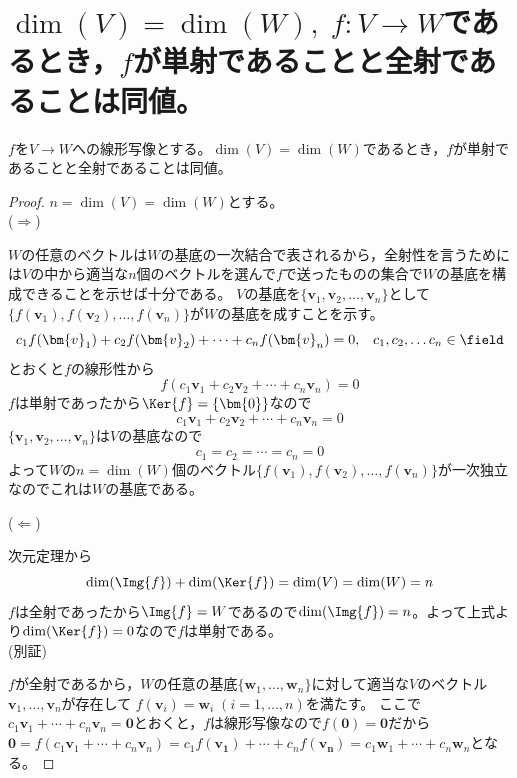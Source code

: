     \section{\texorpdfstring{$\dim(V)=\dim(W),\;f:V\to W$}{dim(V)=dim(W), f:V→W}であるとき，\texorpdfstring{$f$}{f}が単射であることと全射であることは同値。}
        \begin{shadebox}
            $f$を$V\rightarrow W$への線形写像とする。$\dim(V)=\dim(W)$であるとき，$f$が単射であることと全射であることは同値。
        \end{shadebox}
        \begin{proof}
            \quad\par
            \noindent
            $n=\dim(V)=\dim(W)$とする。\\
            ($\Rightarrow$)
            \par
            $W$の任意のベクトルは$W$の基底の一次結合で表されるから，全射性を言うためには$V$の中から適当な$n$個のベクトルを選んで$f$で送ったものの集合で$W$の基底を構成できることを示せば十分である。
            $V$の基底を$\{\bm{v}_1,\bm{v}_2,\dots,\bm{v}_n\}$として$\{f(\bm{v}_1),f(\bm{v}_2),\dots,f(\bm{v}_n)\}$が$W$の基底を成すことを示す。
            \[c_1f(\bm{v}_1)+c_2f(\bm{v}_2)+\dotsb+c_nf(\bm{v}_n) = 0,\;\;\;c_1,c_2,\dots c_n\in\field\]
            とおくと$f$の線形性から
            \[f(c_1\bm{v}_1+c_2\bm{v}_2+\dotsb+c_n\bm{v}_n) = 0\]
            $f$は単射であったから$\Ker{f}=\{\bm{0}\}$なので
            \[c_1\bm{v}_1+c_2\bm{v}_2+\dotsb+c_n\bm{v}_n = 0\]
            $\{\bm{v}_1,\bm{v}_2,\dots,\bm{v}_n\}$は$V$の基底なので
            \[c_1=c_2=\dotsb=c_n = 0\]
            よって$W$の$n=\dim(W)$個のベクトル$\{f(\bm{v}_1),f(\bm{v}_2),\dots,f(\bm{v}_n)\}$が一次独立なのでこれは$W$の基底である。
            \newline\par
            \noindent
            ($\Leftarrow$)
            \par
            次元定理から
            \[\dim(\Img{f}) + \dim(\Ker{f}) = \dim(V) = \dim(W) = n\]
            $f$は全射であったから$\Img{f}=W$であるので$\dim(\Img{f}) = n$。よって上式より$\dim(\Ker{f}) = 0$なので$f$は単射である。\\
            (別証)
            \par
            $f$が全射であるから，$W$の任意の基底$\{\bm{w}_1,\dotsc,\bm{w}_n\}$に対して適当な$V$のベクトル$\bm{v}_1,\dotsc,\bm{v}_n$が存在して
            $f(\bm{v}_i)=\bm{w}_i\;(i=1,\dotsc,n)$を満たす。
            ここで$c_1\bm{v}_1 + \dotsb + c_n\bm{v}_n = \bm{0}$とおくと，$f$は線形写像なので$f(\bm{0})=\bm{0}$だから$\bm{0} = f(c_1\bm{v}_1 + \dotsb + c_n\bm{v}_n) = c_1f(\bm{v_1}) + \dotsb + c_nf(\bm{v_n}) = c_1\bm{w}_1 + \dotsb + c_n\bm{w}_n$となる。

\end{proof}
